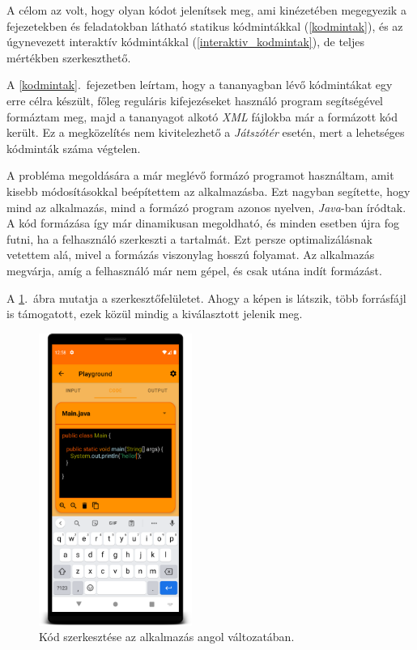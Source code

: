 \documentclass[12pt,a4paper]{article}
\newcommand{\xml}{\textit{XML}\xspace}
\begin{document}
	A célom az volt, hogy olyan kódot jelenítsek meg, ami kinézetében megegyezik a fejezetekben és feladatokban látható statikus kódmintákkal (\ref{kodmintak}), és az úgynevezett interaktív kódmintákkal (\ref{interaktiv_kodmintak}), de teljes mértékben szerkeszthető.  
	
	A \ref{kodmintak}.\ fejezetben leírtam, hogy a tananyagban lévő kódmintákat egy erre célra készült, főleg reguláris kifejezéseket használó program segítségével formáztam meg, majd a tananyagot alkotó \xml fájlokba már a formázott kód került. Ez a megközelítés nem kivitelezhető a \textit{Játszótér} esetén, mert a lehetséges kódminták száma végtelen.
	
	A probléma megoldására a már meglévő formázó programot használtam, amit kisebb módosításokkal beépítettem az alkalmazásba. Ezt nagyban segítette, hogy mind az alkalmazás, mind a formázó program azonos nyelven, \textit{Java}-ban íródtak. A kód formázása így már dinamikusan megoldható, és minden esetben újra fog futni, ha a felhasználó szerkeszti a tartalmát. Ezt persze optimalizálásnak vetettem alá, mivel a formázás viszonylag hosszú folyamat. Az alkalmazás megvárja, amíg a felhasználó már nem gépel, és csak utána indít formázást.
	
	A \ref{playground_code_figure}.\ ábra mutatja a szerkesztőfelületet. Ahogy a képen is látszik, több forrásfájl is támogatott, ezek közül mindig a kiválasztott jelenik meg.
	
	\begin{figure}[h!]
		\centering
		\includegraphics[width=5cm]{playground_code}
		\caption{Kód szerkesztése az alkalmazás angol változatában.}
		\label{playground_code_figure}
	\end{figure}
\end{document}
